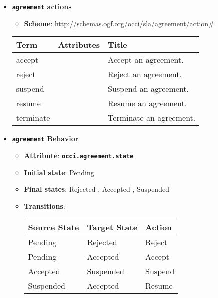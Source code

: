 \begin{itemize}
\item \textbf{\texttt{agreement} actions}

\begin{itemize}
	\item \textbf{Scheme}: http://schemas.ogf.org/occi/sla/agreement/action\#
\end{itemize}

\begin{center}
\begin{tabular}{|l|l|l|}
  \hline
  \textbf{Term}  & \textbf{Attributes} & \textbf{Title} \\
  \hline  
  accept & & Accept an agreement. \\
  \hline
  reject & & Reject an agreement. \\
  \hline
  suspend & & Suspend an agreement. \\
  \hline
  resume & & Resume an agreement. \\
  \hline
  terminate & & Terminate an agreement. \\
  \hline
\end{tabular}
\end{center}
\end{itemize}

\begin{itemize}
\item \textbf{\texttt{agreement} Behavior}
\begin{itemize}
\item \textbf{Attribute}: \textbf{\texttt{occi.agreement.state}}
\item \textbf{Initial state}: Pending
\item \textbf{Final states}:  	Rejected
, 	Accepted
, 	Suspended
\item \textbf{Transitions}:

\begin{center}
\begin{tabular}{|l|l|l|}
  \hline
  \textbf{Source State} & \textbf{Target State} & \textbf{Action} \\
  \hline  
  Pending & Rejected & Reject  \\
  \hline
  Pending & Accepted & Accept  \\
  \hline
  Accepted & Suspended & Suspend  \\
  \hline
  Suspended & Accepted & Resume  \\
  \hline
\end{tabular}
\end{center}
\end{itemize}
\end{itemize}


